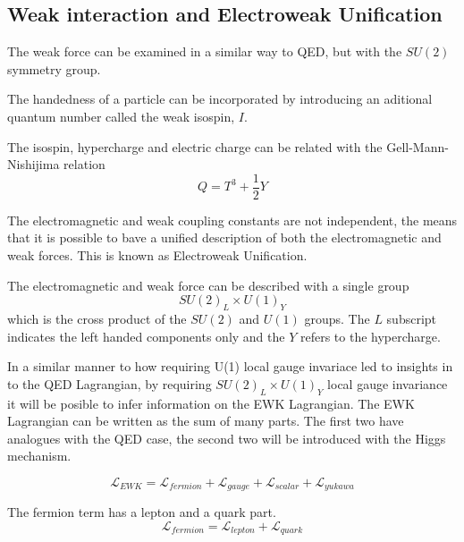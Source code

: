 \subsection{Weak interaction and Electroweak Unification}

The weak force can be examined in a similar way to QED, but with the $SU(2)$
symmetry group. 


The handedness of a particle can be incorporated by introducing an aditional
quantum number called the weak isospin, $I$.

The isospin, hypercharge and electric charge can be related with the
Gell-Mann-Nishijima relation
\begin{equation}
Q = T^{3} + \frac{1}{2}Y
\end{equation}

The electromagnetic and weak coupling constants are not independent, the means that it is
possible to bave a unified description of both the electromagnetic and weak
forces. This is known as Electroweak Unification.

The electromagnetic and weak force can be described with a single group
\begin{equation}
SU(2)_{L} \times U(1)_{Y}
\end{equation}
which is the cross product of the $SU(2)$ and $U(1)$ groups. The $L$ subscript
indicates the left handed components only and the $Y$ refers to the hypercharge.

In a similar manner to how requiring U(1) local gauge invariace led to insights
in to the QED Lagrangian, by requiring $SU(2)_{L} \times U(1)_{Y}$ local gauge
invariance it will be posible to infer information on the EWK Lagrangian.
The EWK Lagrangian can be written as the sum of many parts. The first two have
analogues with the QED case, the second two will be introduced with the Higgs
mechanism.

\begin{equation}
\mathcal{L}_{EWK} = 
\mathcal{L}_{fermion}
+ \mathcal{L}_{gauge}
+ \mathcal{L}_{scalar}
+ \mathcal{L}_{yukawa}
\end{equation}

The fermion term has a lepton and a quark part.
\begin{equation}
\mathcal{L}_{fermion} =
 \mathcal{L}_{lepton}
+ \mathcal{L}_{quark}
\end{equation}

